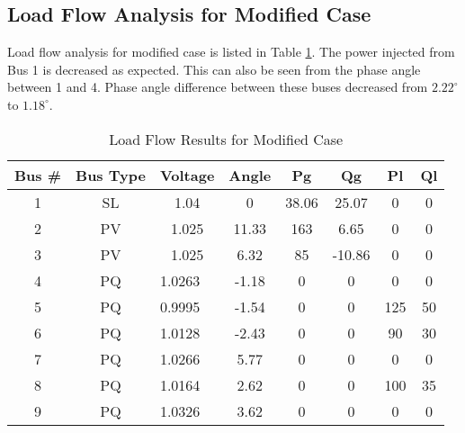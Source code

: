 \subsection{Load Flow Analysis for Modified Case}
Load flow analysis for modified case is listed in Table \ref{loadflow_case2}. The power injected from Bus 1 is decreased as expected. This can also be seen from the phase angle between 1 and 4. Phase angle difference between these buses decreased from $2.22^{\circ}$ to $1.18^{\circ}$.
\begin{table}[h!]
	\centering
	\begin{tabular}{cclccccc}
		\hline
		Bus \# & Bus Type & \multicolumn{1}{c}{Voltage} & Angle & Pg    & Qg     & Pl  & Ql \\ \hline
		1      & SL       & \multicolumn{1}{c}{1.04}    & 0     & 38.06 & 25.07  & 0   & 0  \\
		2      & PV       & \multicolumn{1}{c}{1.025}   & 11.33 & 163   & 6.65   & 0   & 0  \\
		3      & PV       & \multicolumn{1}{c}{1.025}   & 6.32  & 85    & -10.86 & 0   & 0  \\
		4      & PQ       & 1.0263                      & -1.18 & 0     & 0      & 0   & 0  \\
		5      & PQ       & 0.9995                      & -1.54 & 0     & 0      & 125 & 50 \\
		6      & PQ       & 1.0128                      & -2.43 & 0     & 0      & 90  & 30 \\
		7      & PQ       & 1.0266                      & 5.77  & 0     & 0      & 0   & 0  \\
		8      & PQ       & 1.0164                      & 2.62  & 0     & 0      & 100 & 35 \\
		9      & PQ       & 1.0326                      & 3.62  & 0     & 0      & 0   & 0  \\ \hline
	\end{tabular}
	\caption{Load Flow Results for Modified Case}
	\label{loadflow_case2}
\end{table}
